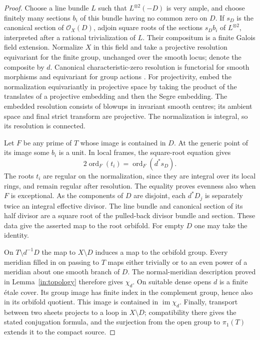 \begin{proof}
Choose a line bundle \(L\) such that \(L^{\otimes2}(-D)\) is very ample,
and choose finitely many sections \(b_i\) of this bundle having no
common zero on \(D\).  If \(s_D\) is the canonical section of
\(\mathcal O_X(D)\), adjoin square roots of the sections \(s_Db_i\) of
\(L^{\otimes2}\), interpreted after a rational trivialization of \(L\).
Their compositum is a finite Galois field extension.  Normalize \(X\)
in this field and take a projective resolution equivariant for the
finite group, unchanged over the smooth locus; denote the composite
by \(d\).  Canonical characteristic-zero resolution is functorial
for smooth morphisms and equivariant for group actions
\cite[Theorems~1.0.2--1.0.3]{Wlodarczyk}.  For projectivity, embed the
normalization equivariantly in projective space by taking the product
of the translates of a projective embedding and then the Segre
embedding.  The embedded resolution consists of blowups in invariant
smooth centres; its ambient space and final strict transform are
projective.  The normalization is integral, so its resolution is
connected.

Let \(F\) be any prime of \(T\) whose image is contained in \(D\).  At
the generic point of its image some \(b_i\) is a unit.  In local frames,
the square-root equation gives
\[
 2\operatorname{ord}_F(t_i)
   =\operatorname{ord}_F(d^*s_D).
\]
The roots \(t_i\) are regular on the normalization, since they are
integral over its local rings, and remain regular after resolution.
The equality proves evenness also when \(F\) is exceptional.  As the
components of \(D\) are disjoint, each \(d^*D_j\) is separately twice
an integral effective divisor.  The line bundle and canonical section
of its half divisor are a square root of the pulled-back divisor
bundle and section.  These data give the asserted map to the root
orbifold.  For empty \(D\) one may take the identity.

On \(T\setminus d^{-1}D\) the map to \(X\setminus D\) induces a map
to the orbifold group.  Every meridian filled in on passing to \(T\)
maps either trivially or to an even power of a meridian about one
smooth branch of \(D\).  The normal-meridian description proved in
Lemma~\ref{in:topology} therefore gives \(\chi_d\).  On suitable dense
opens \(d\) is a finite \'{e}tale cover.  Its group image has finite
index in the complement group, hence also in its orbifold quotient.
This image is contained in \(\operatorname{im}\chi_d\).  Finally,
transport between two sheets projects to a loop in \(X\setminus D\);
compatibility there gives the stated conjugation formula, and the
surjection from the open group to \(\pi_1(T)\) extends it to the
compact source.
\end{proof}

